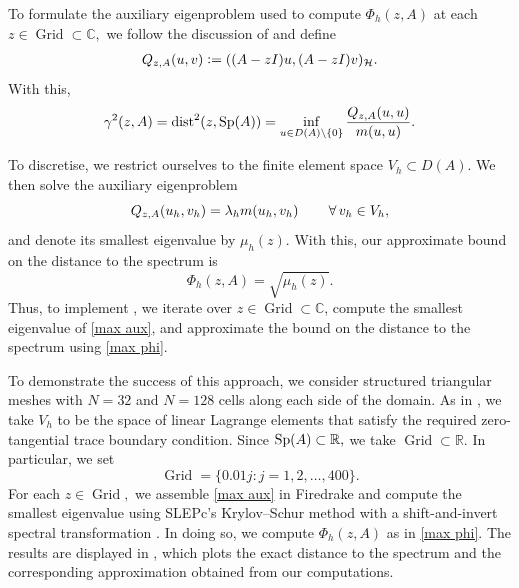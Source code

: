 To formulate the auxiliary eigenproblem used to compute $\Phi_h(z, A)$ at each $z \in \operatorname{Grid} \subset \mathbb{C},$ we follow the discussion of  and define
\begin{align}
    Q_{z, A}(u, v) \vcentcolon=  ((A-zI) u, (A-zI) v)_{\mathcal{H}}.
\end{align}
With this,
\begin{equation}
    \gamma^2(z, A) = \operatorname{dist}^2(z, \operatorname{Sp}\!\left(A\right)) = \inf_{u \in D(A)\setminus \{0\}} \frac{Q_{z, A}(u, u)}{m(u, u)}.
\end{equation}


To discretise, we restrict ourselves to the finite element space $V_h \subset D(A).$ We then solve the auxiliary eigenproblem
\begin{equation} \label{max aux}
    Q_{z, A}(u_h, v_h) = \lambda_h m(u_h, v_h) \qquad \operatorname{\forall} v_h \in V_h,
\end{equation}
and denote its smallest eigenvalue by $\mu_h(z).$
With this, our approximate bound on the distance to the spectrum is
\begin{equation} \label{max phi}
    \Phi_h(z, A) = \sqrt{\mu_h(z)}.
\end{equation}
Thus, to implement , we iterate over $z \in \operatorname{Grid} \subset \mathbb{C}$, compute the smallest eigenvalue of \eqref{max aux}, and approximate the bound on the distance to the spectrum using \eqref{max phi}. 


To demonstrate the success of this approach, we consider structured triangular meshes with $N = 32$ and $N=128$ cells along each side of the domain. As in , we take $V_h$ to be the space of linear Lagrange elements that satisfy the required zero-tangential trace boundary condition. Since $\operatorname{Sp}\!\left(A\right) \subset \mathbb{R},$ we take $\operatorname{Grid} \subset \mathbb{R}.$ In particular, we set
\begin{equation} \label{1grid}
    \operatorname{Grid} = \{0.01j : j = 1, 2, \dots, 400 \}.
\end{equation}
For each $z \in \operatorname{Grid},$ we assemble \eqref{max aux} in Firedrake and compute the smallest eigenvalue using SLEPc's Krylov--Schur method with a shift-and-invert spectral transformation \cite{Firedrake, slep}. In doing so, we compute $\Phi_h(z, A)$ as in \eqref{max phi}. The results are displayed in , which plots the exact distance to the spectrum and the corresponding approximation obtained from our computations.

